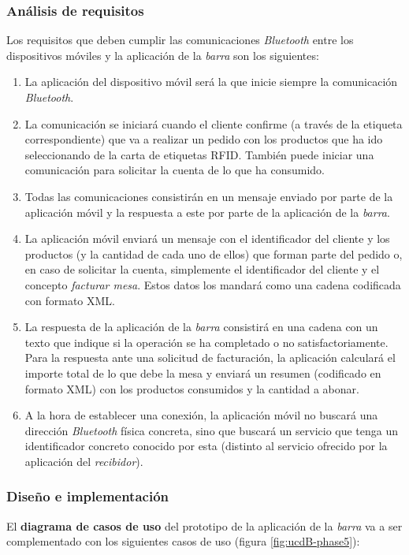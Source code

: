 \subsubsection{Análisis de requisitos}
Los requisitos que deben cumplir las comunicaciones \emph{Bluetooth} entre
los dispositivos móviles y la aplicación de la \emph{barra} son los
siguientes:
\begin{enumerate}
\item La aplicación del dispositivo móvil será la que inicie siempre la
comunicación \emph{Bluetooth}.
\item La comunicación se iniciará cuando el cliente confirme (a través de la
etiqueta correspondiente) que va a realizar un pedido con los productos que ha 
ido seleccionando de la carta de etiquetas \acs{RFID}. También puede iniciar
una comunicación para solicitar la cuenta de lo que ha consumido.
\item Todas las comunicaciones consistirán en un mensaje enviado por parte de
la aplicación móvil y la respuesta a este por parte de la aplicación de la
\emph{barra}.
\item La aplicación móvil enviará un mensaje con el identificador del cliente
y los productos (y la cantidad de cada uno de ellos) que forman parte del
pedido o, en caso de solicitar la cuenta, simplemente el identificador del
cliente y el concepto \emph{facturar mesa}. Estos datos los mandará como una
cadena codificada con formato \acs{XML}.
\item La respuesta de la aplicación de la \emph{barra} consistirá en una cadena 
con un texto que indique si la operación se ha completado o no 
satisfactoriamente.
Para la respuesta ante una solicitud de facturación, la aplicación calculará
el importe total de lo que debe la mesa y enviará un resumen (codificado
en formato \acs{XML}) con los productos consumidos y la cantidad a abonar.
\item A la hora de establecer una conexión, la aplicación móvil no buscará una
dirección \emph{Bluetooth} física concreta, sino que buscará un servicio que
tenga un identificador concreto conocido por esta (distinto al servicio
ofrecido por la aplicación del \emph{recibidor}).
\end{enumerate}

\subsubsection{Diseño e implementación}
El \textbf{diagrama de casos de uso} del prototipo de la aplicación de la
\emph{barra} va a ser complementado con los siguientes casos de uso (figura
\ref{fig:ucdB-phase5}):

